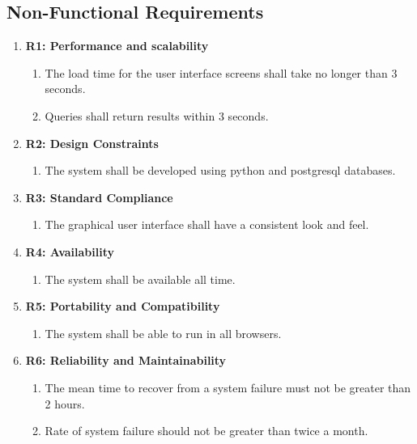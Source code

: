 \subsection{Non-Functional Requirements}
\begin{enumerate}[font=\bfseries]
    \item \textbf{R1: Performance and scalability}
          \begin{enumerate}
              \item The load time for the user interface screens shall take no longer than 3 seconds.
              \item Queries shall return results within 3 seconds.
          \end{enumerate}
    \item \textbf{R2: Design Constraints}
          \begin{enumerate}
              \item The system shall be developed using python and postgresql databases.
          \end{enumerate}
    \item \textbf{R3: Standard Compliance}
          \begin{enumerate}
              \item The graphical user interface shall have a consistent look and feel.
          \end{enumerate}
    \item \textbf{R4: Availability}
          \begin{enumerate}
              \item The system shall be available all time.
          \end{enumerate}
    \item \textbf{R5: Portability and Compatibility}
          \begin{enumerate}
              \item The system shall be able to run in all browsers.
          \end{enumerate}
    \item \textbf{R6: Reliability and Maintainability}
          \begin{enumerate}
              \item The mean time to recover from a system failure must not be greater than 2 hours.
              \item Rate of system failure should not be greater than twice a month.
          \end{enumerate}
\end{enumerate}

